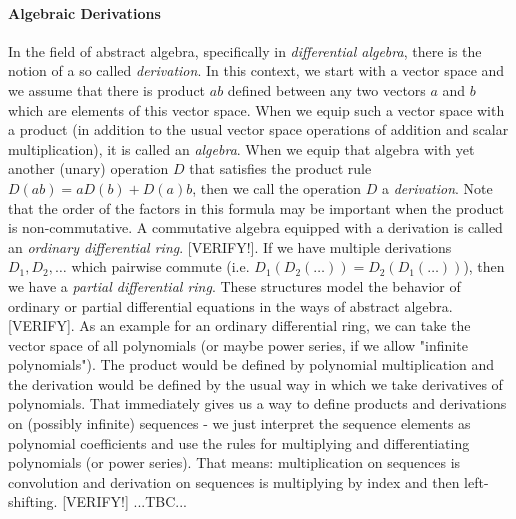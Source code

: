 \paragraph{Algebraic Derivations}
In the field of abstract algebra, specifically in \emph{differential algebra}, there is the notion of a so called \emph{derivation}. In this context, we start with a vector space and we assume that there is product $a b$ defined between any two vectors $a$ and $b$ which are elements of this vector space. When we equip such a vector space with a product (in addition to the usual vector space operations of addition and scalar multiplication), it is called an \emph{algebra}. When we equip that algebra with yet another (unary) operation $D$ that satisfies the product rule $D(a b) = a D(b) + D(a) b$, then we call the operation $D$ a \emph{derivation}. Note that the order of the factors in this formula may be important when the product is non-commutative. A commutative algebra equipped with a derivation is called an \emph{ordinary differential ring}. [VERIFY!]. If we have multiple derivations $D_1, D_2, \ldots$ which pairwise commute (i.e. $D_1(D_2(\ldots)) = D_2(D_1(\ldots))$), then we have a \emph{partial differential ring}. These structures model the behavior of ordinary or partial differential equations in the ways of abstract algebra. [VERIFY]. As an example for an ordinary differential ring, we can take the vector space of all polynomials (or maybe power series, if we allow "infinite polynomials"). The product would be defined by polynomial multiplication and the derivation would be defined by the usual way in which we take derivatives of polynomials. That immediately gives us a way to define products and derivations on (possibly infinite) sequences - we just interpret the sequence elements as polynomial coefficients and use the rules for multiplying and differentiating polynomials (or power series). That means: multiplication on sequences is convolution and derivation on sequences is multiplying by index and then left-shifting. [VERIFY!] ...TBC...


%
%

